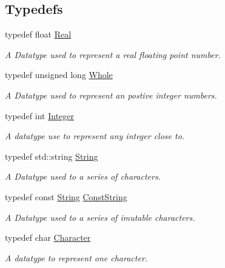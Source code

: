 \subsection*{Typedefs}
\begin{DoxyCompactItemize}
\item 
typedef float \hyperlink{namespacephys_af7eb897198d265b8e868f45240230d5f}{Real}
\begin{DoxyCompactList}\small\item\em A Datatype used to represent a real floating point number. \item\end{DoxyCompactList}\item 
typedef unsigned long \hyperlink{namespacephys_a460f6bc24c8dd347b05e0366ae34f34a}{Whole}
\begin{DoxyCompactList}\small\item\em A Datatype used to represent an postive integer numbers. \item\end{DoxyCompactList}\item 
typedef int \hyperlink{namespacephys_a7f09bf5585b2bb97613cd9aad4273a81}{Integer}
\begin{DoxyCompactList}\small\item\em A datatype use to represent any integer close to. \item\end{DoxyCompactList}\item 
typedef std::string \hyperlink{namespacephys_aa03900411993de7fbfec4789bc1d392e}{String}
\begin{DoxyCompactList}\small\item\em A Datatype used to a series of characters. \item\end{DoxyCompactList}\item 
typedef const \hyperlink{namespacephys_aa03900411993de7fbfec4789bc1d392e}{String} \hyperlink{namespacephys_a5ce5049f8b4bf88d6413c47b504ebb31}{ConstString}
\begin{DoxyCompactList}\small\item\em A Datatype used to a series of imutable characters. \item\end{DoxyCompactList}\item 
typedef char \hyperlink{namespacephys_a3098bae5b0a3cd16eec331f766cc562b}{Character}
\begin{DoxyCompactList}\small\item\em A datatype to represent one character. \item\end{DoxyCompactList}\item 

\end{DoxyCompactItemize}
